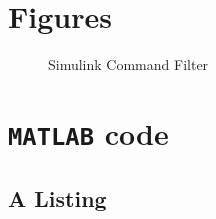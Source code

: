 
\section{Figures}
\begin{figure}[h!]
	\centering
	\caption{Simulink Command Filter\label{fig:app.CF}}
\end{figure}		

\section{\texttt{MATLAB} code}
\subsection{A \matlab Listing}

\lstset{language=matlab}


%
%        

%
%
